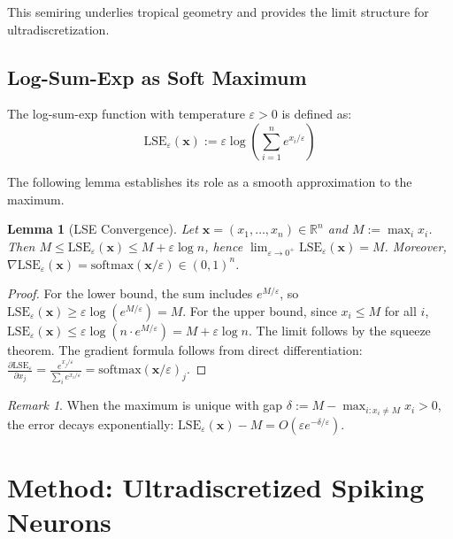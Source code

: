 \documentclass{article}
\theoremstyle{plain}
\newtheorem{lemma}[theorem]{Lemma}
\theoremstyle{definition}
\theoremstyle{remark}
\newtheorem{remark}[theorem]{Remark}
\newcommand{\lse}{\mathrm{LSE}}
\newcommand{\softmax}{\mathrm{softmax}}
\newcommand{\R}{\mathbb{R}}
\newcommand{\eps}{\varepsilon}
\begin{document}
This semiring underlies tropical geometry and provides the limit structure for ultradiscretization.

\subsection{Log-Sum-Exp as Soft Maximum}
\label{sec:lse}

The log-sum-exp function with temperature $\eps > 0$ is defined as:
\begin{equation}
\lse_\eps(\mathbf{x}) := \eps \log\left(\sum_{i=1}^n e^{x_i/\eps}\right)
\label{eq:lse_def}
\end{equation}

The following lemma establishes its role as a smooth approximation to the maximum.

\begin{lemma}[LSE Convergence]
\label{lem:lse_convergence}
Let $\mathbf{x} = (x_1, \ldots, x_n) \in \R^n$ and $M := \max_i x_i$. Then $M \leq \lse_\eps(\mathbf{x}) \leq M + \eps \log n$, hence $\lim_{\eps \to 0^+} \lse_\eps(\mathbf{x}) = M$. Moreover, $\nabla \lse_\eps(\mathbf{x}) = \softmax(\mathbf{x}/\eps) \in (0,1)^n$.
\end{lemma}

\begin{proof}
For the lower bound, the sum includes $e^{M/\eps}$, so $\lse_\eps(\mathbf{x}) \geq \eps \log(e^{M/\eps}) = M$. For the upper bound, since $x_i \leq M$ for all $i$, $\lse_\eps(\mathbf{x}) \leq \eps \log(n \cdot e^{M/\eps}) = M + \eps \log n$. The limit follows by the squeeze theorem. The gradient formula follows from direct differentiation: $\frac{\partial \lse_\eps}{\partial x_j} = \frac{e^{x_j/\eps}}{\sum_i e^{x_i/\eps}} = \softmax(\mathbf{x}/\eps)_j$.
\end{proof}

\begin{remark}
When the maximum is unique with gap $\delta := M - \max_{i: x_i \neq M} x_i > 0$, the error decays exponentially: $\lse_\eps(\mathbf{x}) - M = O(\eps e^{-\delta/\eps})$.
\end{remark}

\section{Method: Ultradiscretized Spiking Neurons}
\label{sec:method}
\end{document}
